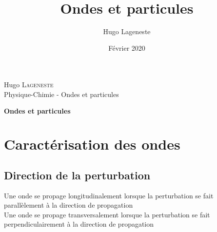 \documentclass[a4paper]{article}
\title{Ondes et particules}
\author{Hugo Lageneste}
\date{Février 2020}
\begin{document}
{Hugo \textsc{Lageneste}}\\
{Physique-Chimie - Ondes et particules}

\begin{center}
 \newcommand{\HRule}{\rule{\linewidth}{0.5mm}}
 {\huge \bfseries Ondes et particules}\\[0.1cm]
\end{center}

\section{Caractérisation des ondes}
\subsection{Direction de la perturbation}
{Une onde se propage longitudinalement lorsque la perturbation se fait parallèlement à la direction de propagation}\\
{Une onde se propage transversalement lorsque la perturbation se fait perpendiculairement à la direction de propagation}
\end{document}
